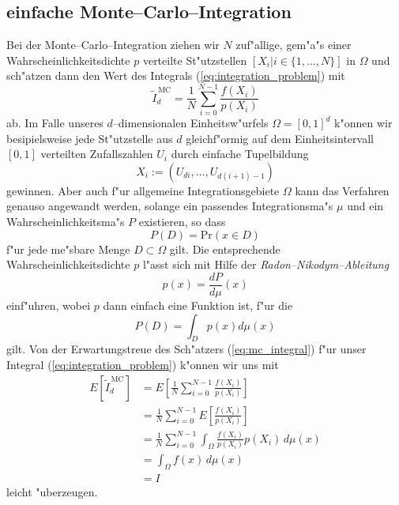 	\subsection{einfache Monte--Carlo--Integration}
	Bei der Monte--Carlo--Integration ziehen wir $N$ zuf"allige, gem"a"s einer Wahrscheinlichkeitsdichte $p$ verteilte St"utzstellen $[X_i|i\in\{1,\dots,N\}]$ in $\Omega$ und sch"atzen dann den Wert des Integrals (\ref{eq:integration_problem}) mit
	\begin{equation}
		{\tilde I}_d^{\,\text{MC}}=\frac{1}{N}\sum_{i=0}^{N-1} \frac{f(X_i)}{p(X_i)}
		\label{eq:mc_integral}
	\end{equation}
	ab. Im Falle unseres $d$--dimensionalen Einheitsw"urfels $\Omega=[0,1]^d$ k"onnen wir besipielsweise jede St"utzstelle aus $d$ gleichf"ormig auf dem Einheitsintervall $[0,1]$ verteilten Zufallszahlen $U_i$ durch einfache Tupelbildung
	$$X_i:=(U_{d i},\dots,U_{d(i+1)-1})$$
	gewinnen. Aber auch f"ur allgemeine Integrationsgebiete $\Omega$ kann das Verfahren genauso angewandt werden, solange ein passendes Integrationsma"s $\mu$ und ein Wahrscheinlichkeitsma"s $P$ existieren, so dass $$P(D)=\text{Pr}(x\in D)$$ f"ur jede me"sbare Menge $D\subset\Omega$ gilt. Die entsprechende Wahrscheinlichkeitsdichte $p$ l"asst sich mit Hilfe der {\em Radon--Nikodym--Ableitung} $$p(x)=\frac{dP}{d\mu}(x)$$
	einf"uhren, wobei $p$ dann einfach eine Funktion ist, f"ur die $$P(D)=\int_D p(x)d\mu(x)$$ gilt.
	Von der Erwartungstreue des Sch"atzers (\ref{eq:mc_integral}) f"ur unser Integral (\ref{eq:integration_problem}) k"onnen wir uns mit \citep[][2.4]{Veach:1997p9136}
	\begin{align*}
		E[{\tilde I}_d^{\,\text{MC}}] &=E\left[\frac{1}{N}\sum_{i=0}^{N-1}\frac{f(X_i)}{p(X_i)}\right] \\
			&= \frac{1}{N}\sum_{i=0}^{N-1}E\left[\frac{f(X_i)}{p(X_i)}\right] \\
			&= \frac{1}{N}\sum_{i=0}^{N-1}\int_\Omega \frac{f(X_i)}{p(X_i)}p(X_i)\,d\mu(x) \\
			&= \int_\Omega f(x)\,d\mu(x)\\
			&= I
	\end{align*}
	leicht "uberzeugen.
	
